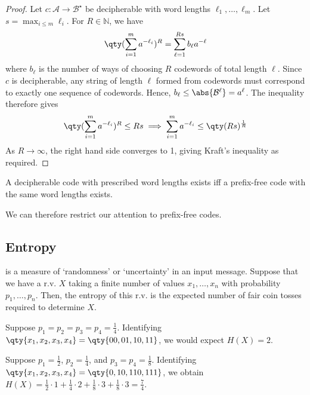 \begin{proof}
    Let $c \colon \mathcal A \to \mathcal B^\star$ be decipherable with word lengths $\ell_1, \dots, \ell_m$.
    Let $s = \max_{i \leq m} \ell_i$.
    For $R \in \mathbb N$, we have
    \begin{align*}
        \qty(\sum_{i=1}^m a^{-\ell_i})^R = \sum_{\ell = 1}^{Rs} b_\ell a^{-\ell}
    \end{align*}
    where $b_\ell$ is the number of ways of choosing $R$ codewords of total length $\ell$.
    Since $c$ is decipherable, any string of length $\ell$ formed from codewords must correspond to exactly one sequence of codewords.
    Hence, $b_\ell \leq \abs{\mathcal B^\ell} = a^\ell$.
    The inequality therefore gives
    \begin{align*}
        \qty(\sum_{i=1}^m a^{-\ell_i})^R \leq Rs \implies \sum_{i=1}^m a^{-\ell_i} \leq \qty(Rs)^{\frac{1}{R}}
    \end{align*}
    As $R \to \infty$, the right hand side converges to 1, giving Kraft's inequality as required.
\end{proof}

\begin{corollary}
    A decipherable code with prescribed word lengths exists iff a prefix-free code with the same word lengths exists.
\end{corollary}
We can therefore restrict our attention to prefix-free codes.

\subsection{Entropy}
 is a measure of `randomness' or `uncertainty' in an input message.
Suppose that we have a r.v. $X$ taking a finite number of values $x_1, \dots, x_n$ with probability $p_1, \dots, p_n$.
Then, the entropy of this r.v. is the expected number of fair coin tosses required to determine $X$.

\begin{example}
    Suppose $p_1 = p_2 = p_3 = p_4 = \frac{1}{4}$.
    Identifying $\qty{x_1, x_2, x_3, x_4} = \qty{00, 01, 10, 11}$, we would expect $H(X) = 2$.
\end{example}

\begin{example}
    Suppose $p_1 = \frac{1}{2}$, $p_2 = \frac{1}{4}$, and $p_3 = p_4 = \frac{1}{8}$.
    Identifying $\qty{x_1, x_2, x_3, x_4} = \qty{0, 10, 110, 111}$, we obtain $H(X) = \frac{1}{2} \cdot 1 + \frac{1}{4} \cdot 2 + \frac{1}{8} \cdot 3 + \frac{1}{8} \cdot 3 = \frac{7}{4}$.
\end{example}

